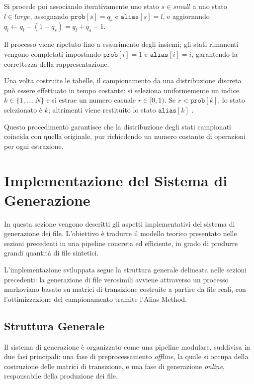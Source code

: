 \documentclass{report}
\begin{document}
Si procede poi associando iterativamente uno stato \(s \in \textit{small}\) a uno stato \(l \in \textit{large}\),
assegnando \(\texttt{prob}[s] = q_s\) e \(\texttt{alias}[s] = l\), e aggiornando
\(q_l \leftarrow q_l - (1 - q_s) = q_l + q_s - 1\).

Il processo viene ripetuto fino a esaurimento degli insiemi; gli stati rimanenti vengono completati
impostando \(\texttt{prob}[i]=1\) e \(\texttt{alias}[i]=i\), garantendo la correttezza della rappresentazione.

\bigskip

Una volta costruite le tabelle, il campionamento da una distribuzione discreta può essere effettuato
in tempo costante: si seleziona uniformemente un indice \(k \in \{1, \dots, N\}\) e si estrae un numero casuale
\(r \in [0,1)\). Se \(r < \texttt{prob}[k]\), lo stato selezionato è \(k\); altrimenti viene restituito lo stato
\(\texttt{alias}[k]\) \cite{walker1977alias}.

\bigskip

Questo procedimento garantisce che la distribuzione degli stati campionati coincida con quella originale,
pur richiedendo un numero costante di operazioni per ogni estrazione.




\section{Implementazione del Sistema di Generazione}

In questa sezione vengono descritti gli aspetti implementativi del sistema di generazione dei file.
L’obiettivo è tradurre il modello teorico
presentato nelle sezioni precedenti in una pipeline concreta ed efficiente,
in grado di produrre grandi quantità di file sintetici.

\bigskip

L'implementazione sviluppata segue la struttura generale delineata nelle sezioni precedenti:
la generazione di file verosimili avviene attraverso un processo markoviano basato su matrici di transizione
costruite a partire da file reali, con l'ottimizzazione del campionamento tramite l'Alias Method.


\subsection{Struttura Generale}

Il sistema di generazione è organizzato come una pipeline modulare, suddivisa in due fasi principali:
una fase di preprocessamento \emph{offline}, la quale si occupa della costruzione delle matrici di transizione, e una
fase di generazione \emph{online}, responsabile della produzione dei file.
\end{document}
